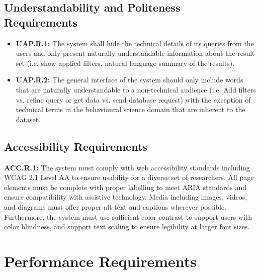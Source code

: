 \documentclass[12pt]{article}
\begin{document}
\subsection{Understandability and Politeness Requirements}

\begin{itemize}
    \item \textbf{UAP.R.1:}\label{req:uap.r.1} The system shall hide the technical details of its queries from the users and only present naturally understandable information
    about the result set (i.e. show applied filters, natural language summary of the results).
    \item \textbf{UAP.R.2:}\label{req:uap.r.2} The general interface of the system should only include words that are naturally understandable to a non-technical audience (i.e. Add filters vs.
    refine query or get data vs. send database request) with the exception of technical terms in the behavioural science domain
    that are inherent to the dataset.
\end{itemize}

\subsection{Accessibility Requirements}

\par{
   \textbf{ACC.R.1:}\label{req:acc.r.1} The system must comply with web accessibility standards including WCAG 2.1 Level AA \cite{WCAG2021} to ensure usability for a diverse set of researchers. All page elements must be complete with proper labelling to meet ARIA standards \cite{W3CARIA2022} and ensure compatibility with assistive technology. Media including images, videos, and diagrams must offer proper alt-text and captions wherever possible. Furthermore, the system must use sufficient color contrast to support users with color blindness, and support text scaling to ensure legibility at larger font sizes.   
}

\section{Performance Requirements}
\end{document}
